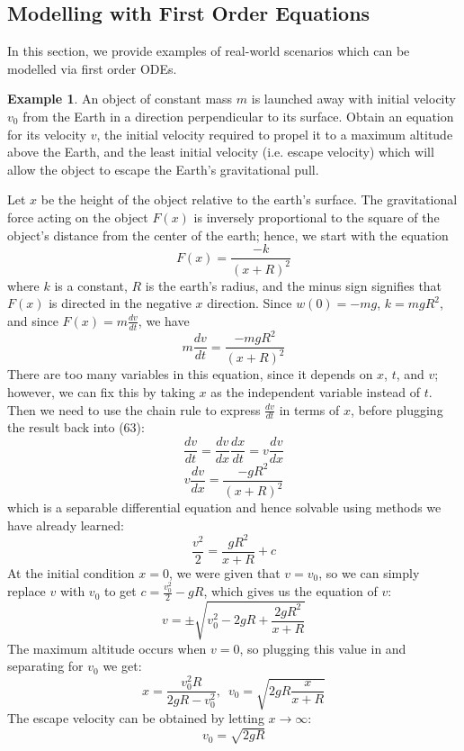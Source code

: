 \documentclass[11pt]{article}
\theoremstyle{definition}
\newtheorem{ex}{Example}
\begin{document}
\subsection{Modelling with First Order Equations}
In this section, we provide examples of real-world scenarios which can be modelled via first order ODEs.
\begin{ex}
    An object of constant mass $m$ is launched away with initial velocity $v_0$ from the Earth in a direction perpendicular to its surface. Obtain an equation for its velocity $v$, the initial velocity required to propel it to a maximum altitude above the Earth, and the least initial velocity (i.e. escape velocity) which will allow the object to escape the Earth's gravitational pull.
\end{ex}
Let $x$ be the height of the object relative to the earth's surface. The gravitational force acting on the object $F(x)$ is inversely proportional to the square of the object's distance from the center of the earth; hence, we start with the equation \begin{equation}
    F(x) = \frac{-k}{(x + R)^2}
\end{equation} where $k$ is a constant, $R$ is the earth's radius, and the minus sign signifies that $F(x)$ is directed in the negative $x$ direction. Since $w(0) = -mg$, $k = mgR^2$, and since $F(x) = m\frac{dv}{dt}$, we have \begin{equation}
    m\frac{dv}{dt} = \frac{-mgR^2}{(x + R)^2}
\end{equation} There are too many variables in this equation, since it depends on $x$, $t$, and $v$; however, we can fix this by taking $x$ as the independent variable instead of $t$. Then we need to use the chain rule to express $\frac{dv}{dt}$ in terms of $x$, before plugging the result back into (63): \begin{equation}
    \frac{dv}{dt} = \frac{dv}{dx}\frac{dx}{dt} = v\frac{dv}{dx}
\end{equation}
\begin{equation}
    v\frac{dv}{dx} = \frac{-gR^2}{(x + R)^2}
\end{equation} which is a separable differential equation and hence solvable using methods we have already learned: \begin{equation}
    \frac{v^2}{2} = \frac{gR^2}{x + R} + c
\end{equation} At the initial condition $x = 0$, we were given that $v = v_0$, so we can simply replace $v$ with $v_0$ to get $c = \frac{v_0^2}{2} - gR$, which gives us the equation of $v$:\begin{equation}
    v = \pm{\sqrt{v_0^2 - 2gR + \frac{2gR^2}{x + R}}}
\end{equation} The maximum altitude occurs when $v = 0$, so plugging this value in and separating for $v_0$ we get:\begin{equation}
    x = \frac{v_0^2R}{2gR - v_0^2},\,\,\, v_0 = \sqrt{2gR\frac{x}{x + R}}
\end{equation} The escape velocity can be obtained by letting $x \rightarrow{\infty}$:\begin{equation}
    v_0 = \sqrt{2gR}
\end{equation}\newpage
\end{document}
